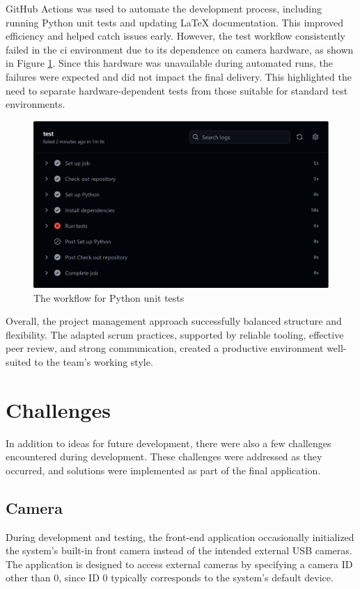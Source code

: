 GitHub Actions was used to automate the development process, including running Python unit tests and updating LaTeX documentation. This improved efficiency and helped catch issues early. However, the test workflow consistently failed in the \gls{ci} environment due to its dependence on camera hardware, as shown in Figure \ref{fig:workflow-test}. Since this hardware was unavailable during automated runs, the failures were expected and did not impact the final delivery. This highlighted the need to separate hardware-dependent tests from those suitable for standard test environments.\\

\begin{figure}[h!] \centering 
\includegraphics[width=0.75\linewidth]{figures/results/workflows/tests.png}\caption[Python tests workflow]{The workflow for Python unit tests}\label{fig:workflow-test} \end{figure}

Overall, the project management approach successfully balanced structure and flexibility. The adapted \gls{scrum} practices, supported by reliable tooling, effective peer review, and strong communication, created a productive environment well-suited to the team's working style. 

\section{Challenges}
In addition to ideas for future development, there were also a few challenges encountered during development. These challenges were addressed as they occurred, and solutions were implemented as part of the final application. \\

\subsection{Camera}

During development and testing, the front-end application occasionally initialized the system’s built-in front camera instead of the intended external USB cameras. The application is designed to access external cameras by specifying a camera ID other than 0, since ID 0 typically corresponds to the system’s default device. \\

